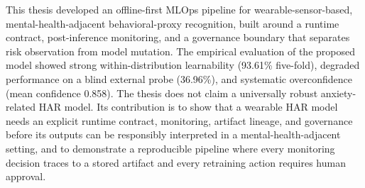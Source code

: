 This thesis developed an offline-first MLOps pipeline for wearable-sensor-based, mental-health-adjacent behavioral-proxy recognition, built around a runtime contract, post-inference monitoring, and a governance boundary that separates risk observation from model mutation. The empirical evaluation of the proposed model showed strong within-distribution learnability (93.61\% five-fold), degraded performance on a blind external probe (36.96\%), and systematic overconfidence (mean confidence 0.858). The thesis does not claim a universally robust anxiety-related HAR model. Its contribution is to show that a wearable HAR model needs an explicit runtime contract, monitoring, artifact lineage, and governance before its outputs can be responsibly interpreted in a mental-health-adjacent setting, and to demonstrate a reproducible pipeline where every monitoring decision traces to a stored artifact and every retraining action requires human approval.
